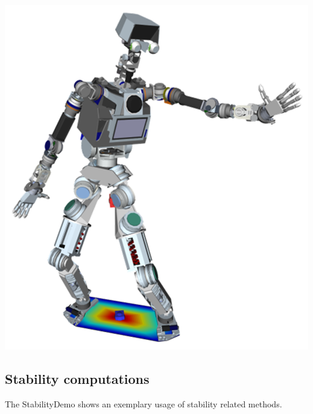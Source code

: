 \documentclass{book}
\begin{document}
\includegraphics[width=\textwidth]{HierarchicalIK}
\subsection{Stability computations}
The StabilityDemo shows an exemplary usage of stability related methods.\par
\end{document}
